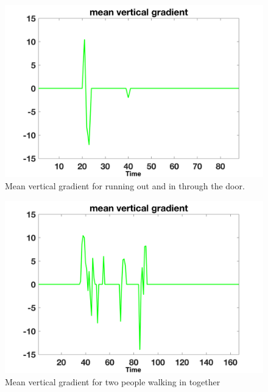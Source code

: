 \documentclass[12pt,oneside]{article} %
\begin{document}
\begin{figure}[!htb]
\centering
\includegraphics[scale=0.52]{images/runoutandin.png}
\caption{Mean vertical gradient for running out and in through the door.}
\label{run}
\end{figure}

\begin{figure}[!htb]
\centering
\includegraphics[scale=0.52]{images/quickoutandin.png}
\caption{Mean vertical gradient for two people walking in together}
\label{together}
\end{figure}
\end{document}
